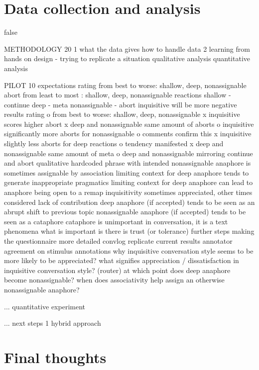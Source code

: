 \documentclass[12pt]{report}
\begin{document}
{%

\chapter{Data collection and analysis}


\if false

METHODOLOGY 20
	1   what the data gives
	       how to handle data
	2 learning from
	    hands on design - trying to replicate a situation
		qualitative analysis
		quantitative analysis

PILOT 10
    expectations
		rating
			from best to worse: shallow, deep, nonassignable
		abort
			from least to most : shallow, deep, nonassignable
		reactions
			shallow 	- continue
			deep		- meta
			nonassignable 	- abort
		inquisitive will be more negative
	results
		rating
			o from best to worse: shallow, deep, nonassignable
			x inquisitive scores higher
		abort
			x deep and nonassignable same amount of aborts
			o inquisitive significantly more aborts for nonassignable
			o comments confirm this
			x inquisitive slightly less aborts for deep
		reactions
			o tendency manifested
			x deep and nonassignable same amount of meta
			o deep and nonassignable mirroring continue and abort
	qualitative
		hardcoded phrase with intended nonassignable anaphore is sometimes assignable by association
		limiting context for deep anaphore tends to generate inappropriate pragmatics
		limiting context for deep anaphore can lead to anaphore being open to a remap
		inquisitivity sometimes appreciated, other times considered lack of contribution
		deep anaphore (if accepted) tends to be seen as an abrupt shift to previous topic
		nonassignable anaphore (if accepted) tends to be seen as a cataphore
		        cataphore is unimportant in conversation, it is a text phenomena
			    what is important is there is trust (or tolerance)
	further steps
		making the questionnaire more detailed
			convlog
		replicate current results
		annotator agreement on stimulus annotations
		why inquisitive conversation style seems to be more likely to be appreciated?
		what signifies appreciation / dissatisfaction in inquisitive conversation style? (router)
		at which point does deep anaphore become nonassignable?
		when does associativity help assign an otherwise nonassignable anaphore?


        ... quantitative experiment

        ... next steps
        1 hybrid approach
\fi

\chapter*{Final thoughts}

}
\end{document}
